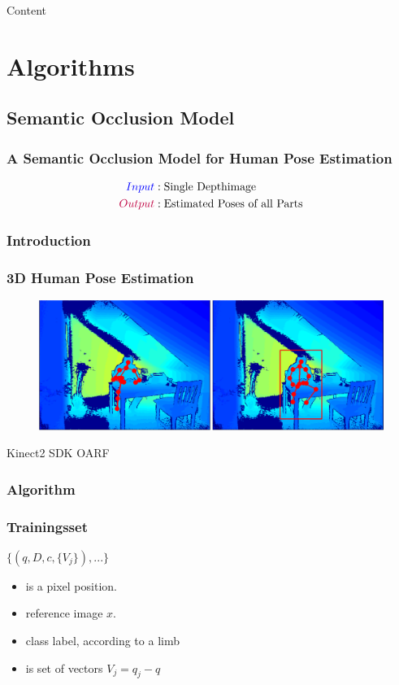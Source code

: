 \documentclass[xcolor=dvipsnames]{beamer}
\begin{document}
\begin{frame}{Content}
	\large
	\tableofcontents[subsubsectionstyle=hide]
\end{frame}

\section{Algorithms}
\subsection{Semantic Occlusion Model}
{
\begin{frame}
	\frametitle{A Semantic Occlusion Model for Human Pose Estimation}
	\vline
	\Large
	
	\begin{align*}
		\textcolor{blue}{Input}&:  \text{Single Depthimage} \\
		\textcolor{purple}{Output}&: \text{Estimated Poses of all Parts}
	\end{align*}
\end{frame}}

\subsubsection{Introduction}
\begin{frame}
\frametitle{3D Human Pose Estimation}
	\begin{figure}
	\includegraphics[width=\textwidth]{img/HPE.png}
	\end{figure}
	Kinect2 SDK \hfill OARF
\end{frame}

\subsubsection{Algorithm}
\begin{frame}
	\frametitle{Trainingsset}
	\Large
	$\{(q, D, c, \{V_j\}), ...\}$
	
	\vspace{1cm}
	
	\begin{itemize}
	    \item{ is a pixel position.}
	    \item{ reference image $x$.}
	    \item{ class label, according to a limb}
	    \item{ is set of vectors $V_j = q_j - q$}
	\end{itemize}
	
\end{frame}
\end{document}
